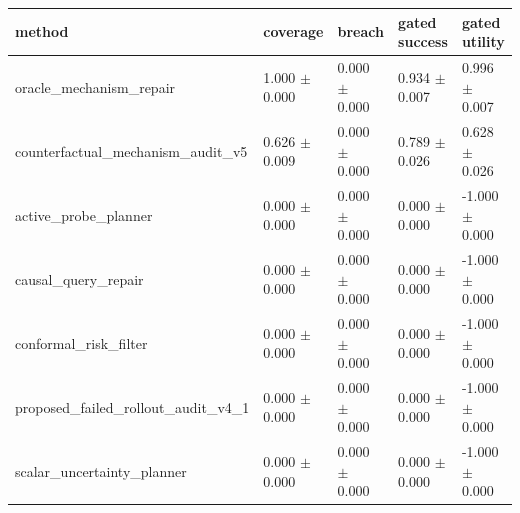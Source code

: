 \begin{tabular}{lllll}
\toprule
method & coverage & breach & gated success & gated utility \\
\midrule
oracle\_mechanism\_repair & 1.000 $\pm$ 0.000 & 0.000 $\pm$ 0.000 & 0.934 $\pm$ 0.007 & 0.996 $\pm$ 0.007 \\
counterfactual\_mechanism\_audit\_v5 & 0.626 $\pm$ 0.009 & 0.000 $\pm$ 0.000 & 0.789 $\pm$ 0.026 & 0.628 $\pm$ 0.026 \\
active\_probe\_planner & 0.000 $\pm$ 0.000 & 0.000 $\pm$ 0.000 & 0.000 $\pm$ 0.000 & -1.000 $\pm$ 0.000 \\
causal\_query\_repair & 0.000 $\pm$ 0.000 & 0.000 $\pm$ 0.000 & 0.000 $\pm$ 0.000 & -1.000 $\pm$ 0.000 \\
conformal\_risk\_filter & 0.000 $\pm$ 0.000 & 0.000 $\pm$ 0.000 & 0.000 $\pm$ 0.000 & -1.000 $\pm$ 0.000 \\
proposed\_failed\_rollout\_audit\_v4\_1 & 0.000 $\pm$ 0.000 & 0.000 $\pm$ 0.000 & 0.000 $\pm$ 0.000 & -1.000 $\pm$ 0.000 \\
scalar\_uncertainty\_planner & 0.000 $\pm$ 0.000 & 0.000 $\pm$ 0.000 & 0.000 $\pm$ 0.000 & -1.000 $\pm$ 0.000 \\
\bottomrule
\end{tabular}
